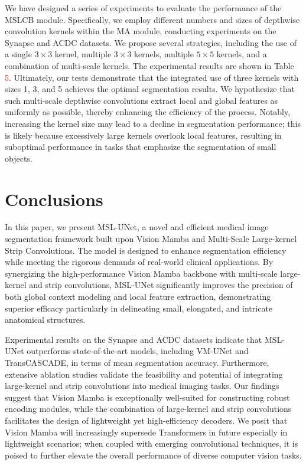 \documentclass[10pt, a4paper, twocolumn]{article}
\begin{document}
We have designed a series of experiments to evaluate the performance of the MSLCB module. Specifically, we employ different numbers and sizes of depthwise convolution kernels within the MA module, conducting experiments on the Synapse and ACDC datasets. We propose several strategies, including the use of a single $3 \times 3$ kernel, multiple $3 \times 3$ kernels, multiple $5 \times 5$ kernels, and a combination of multi-scale kernels. The experimental results are shown in Table \textcolor{red}{5}. Ultimately, our tests demonstrate that the integrated use of three kernels with sizes 1, 3, and 5 achieves the optimal segmentation results. We hypothesize that such multi-scale depthwise convolutions extract local and global features as uniformly as possible, thereby enhancing the efficiency of the process. Notably, increasing the kernel size may lead to a decline in segmentation performance; this is likely because excessively large kernels overlook local features, resulting in suboptimal performance in tasks that emphasize the segmentation of small objects.






\section{Conclusions}

In this paper, we present MSL-UNet, a novel and efficient medical image segmentation framework built upon Vision Mamba and Multi-Scale Large-kernel Strip Convolutions. The model is designed to enhance segmentation efficiency while meeting the rigorous demands of real-world clinical applications. By synergizing the high-performance Vision Mamba backbone with multi-scale large-kernel and strip convolutions, MSL-UNet significantly improves the precision of both global context modeling and local feature extraction, demonstrating superior efficacy particularly in delineating small, elongated, and intricate anatomical structures.

Experimental results on the Synapse and ACDC datasets indicate that MSL-UNet outperforms state-of-the-art models, including VM-UNet and TransCASCADE, in terms of mean segmentation accuracy. Furthermore, extensive ablation studies validate the feasibility and potential of integrating large-kernel and strip convolutions into medical imaging tasks. Our findings suggest that Vision Mamba is exceptionally well-suited for constructing robust encoding modules, while the combination of large-kernel and strip convolutions facilitates the design of lightweight yet high-efficiency decoders. We posit that Vision Mamba will increasingly supersede Transformers in future especially in lightweight scenarios; when coupled with emerging convolutional techniques, it is poised to further elevate the overall performance of diverse computer vision tasks.
\end{document}
